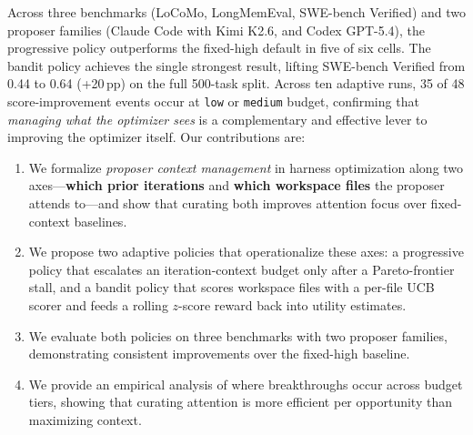 Across three benchmarks (LoCoMo, LongMemEval, SWE-bench Verified) and
two proposer families (Claude Code with Kimi K2.6, and Codex GPT-5.4),
the progressive policy outperforms the fixed-high default in five of six
cells. The bandit policy achieves the single strongest result, lifting
SWE-bench Verified from 0.44 to 0.64 (+20\,pp) on the full 500-task
split. Across ten adaptive runs, 35 of 48 score-improvement events occur
at \texttt{low} or \texttt{medium} budget, confirming that
\emph{managing what the optimizer sees} is a complementary and effective
lever to improving the optimizer itself. Our contributions are:
\begin{enumerate}
    \item We formalize \emph{proposer context management} in harness
    optimization along two axes---\textbf{which prior iterations} and
    \textbf{which workspace files} the proposer attends to---and show
    that curating both improves attention focus over fixed-context
    baselines.
    \item We propose two adaptive policies that operationalize these
    axes: a progressive policy that escalates an iteration-context
    budget only after a Pareto-frontier stall, and a bandit policy
    that scores workspace files with a per-file UCB scorer and feeds a
    rolling $z$-score reward back into utility estimates.
    \item We evaluate both policies on three benchmarks with two
    proposer families, demonstrating consistent improvements over the
    fixed-high baseline.
    \item We provide an empirical analysis of where breakthroughs occur
    across budget tiers, showing that curating attention is more
    efficient per opportunity than maximizing context.
\end{enumerate}
